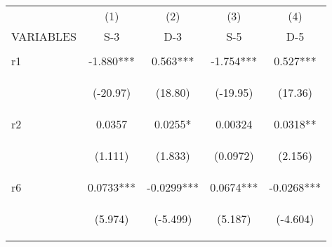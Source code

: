 \documentclass[]{article}
\begin{document}
\begin{center}
\begin{tabular}{lcccc} \hline
 & (1) & (2) & (3) & (4) \\
VARIABLES & S-3 & D-3 & S-5 & D-5 \\ \hline
\vspace{4pt} & \begin{footnotesize}\end{footnotesize} & \begin{footnotesize}\end{footnotesize} & \begin{footnotesize}\end{footnotesize} & \begin{footnotesize}\end{footnotesize} \\
r1 & -1.880*** & 0.563*** & -1.754*** & 0.527*** \\
\vspace{4pt} & \begin{footnotesize}(-20.97)\end{footnotesize} & \begin{footnotesize}(18.80)\end{footnotesize} & \begin{footnotesize}(-19.95)\end{footnotesize} & \begin{footnotesize}(17.36)\end{footnotesize} \\
r2 & 0.0357 & 0.0255* & 0.00324 & 0.0318** \\
\vspace{4pt} & \begin{footnotesize}(1.111)\end{footnotesize} & \begin{footnotesize}(1.833)\end{footnotesize} & \begin{footnotesize}(0.0972)\end{footnotesize} & \begin{footnotesize}(2.156)\end{footnotesize} \\
r6 & 0.0733*** & -0.0299*** & 0.0674*** & -0.0268*** \\
\vspace{4pt} & \begin{footnotesize}(5.974)\end{footnotesize} & \begin{footnotesize}(-5.499)\end{footnotesize} & \begin{footnotesize}(5.187)\end{footnotesize} & \begin{footnotesize}(-4.604)\end{footnotesize} \\

\end{tabular}
\end{center}
\end{document}
